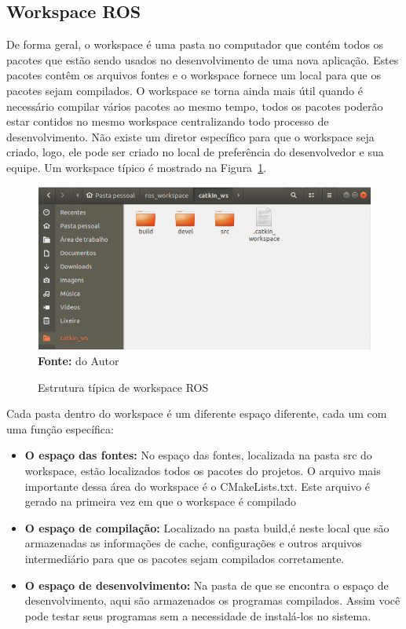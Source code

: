 \subsection{Workspace ROS}
De forma geral, o workspace é uma pasta no computador que contém todos os pacotes que estão sendo usados no desenvolvimento de uma nova aplicação. Estes pacotes contêm os arquivos fontes e o workspace fornece um local para que os pacotes sejam compilados. O workspace se torna ainda mais útil quando é necessário compilar vários pacotes ao mesmo tempo, todos os pacotes poderão estar contidos no mesmo workspace centralizando todo processo de desenvolvimento. Não existe um diretor específico para que o workspace seja criado, logo, ele pode ser criado no local de preferência do desenvolvedor e sua equipe. Um workspace típico é mostrado na Figura~\ref{fig:rosworkspace}. 

\begin{figure}[ht]
	\caption{Estrutura típica de workspace ROS}
	\begin{center}
		\includegraphics[scale=0.43]{imagens/rosworkspace.png}\\
		{\small \textbf{Fonte:} do Autor}
    \end{center}\label{fig:rosworkspace}
\end{figure}

Cada pasta dentro do workspace é um diferente espaço diferente, cada um com uma função específica:

\begin{itemize}
    \item \textbf{O espaço das fontes:} No espaço das fontes, localizada na pasta src do workspace, estão localizados todos os pacotes do projetos. O arquivo mais importante dessa área do workspace é o CMakeLists.txt. Este arquivo é gerado na primeira vez em que o workspace é compilado

    \item \textbf{O espaço de compilação:} Localizado na pasta build,é neste local que são armazenadas as informações de cache, configurações e outros arquivos intermediário para que os pacotes sejam compilados corretamente.

    \item \textbf{O espaço de desenvolvimento:} Na pasta de que se encontra o espaço de desenvolvimento, aqui são armazenados os programas compilados. Assim você pode testar seus programas sem a necessidade de instalá-los no sistema.
\end{itemize}

